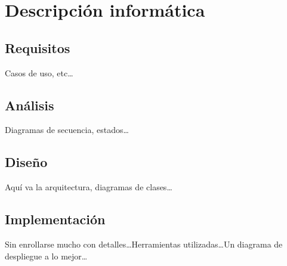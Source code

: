 \chapter{Descripción informática}

\section{Requisitos}

Casos de uso, etc\dots

\section{Análisis}

Diagramas de secuencia, estados\dots

\section{Diseño}

Aquí va la arquitectura, diagramas de clases\dots

\section{Implementación}

Sin enrollarse mucho con detalles\dots Herramientas utilizadas\dots Un diagrama de despliegue a lo mejor\dots
